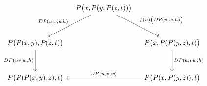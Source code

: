 \[
\begin{tikzcd}[column sep=1.0em, row sep=3.2em]
 &
 P\bigl(x,P(y,P(z,t))\bigr)
   \arrow[dl,"{DP(u,v,wh)}"']
   \arrow[dr,"{f(u)\bigl(DP(v,w,h)\bigr)}"]
 &
 \\
 P\bigl(P(x,y),P(z,t)\bigr)
   \arrow[d,"{DP(uv,w,h)}"']
 &&
 P\bigl(x,P(P(y,z),t)\bigr)
   \arrow[d,"{DP(u,vw,h)}"]
 \\
 P\bigl(P(P(x,y),z),t\bigr)
 &&
 P\bigl(P(x,P(y,z)),t\bigr)
   \arrow[ll,"{DP(u,v,w)}"']
\end{tikzcd}
\]
